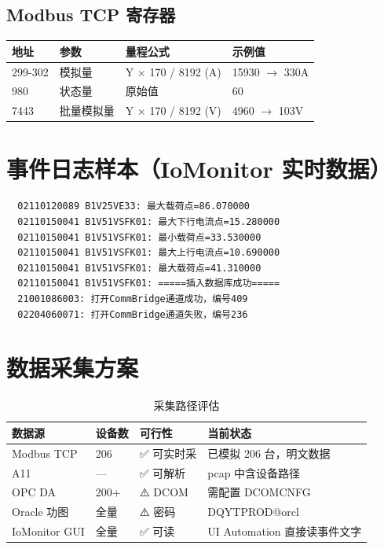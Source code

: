 \documentclass[12pt,a4paper]{ctexart}
\begin{document}
\subsection{Modbus TCP 寄存器}

\begin{table}[H]\centering
\begin{tabular}{p{2cm}p{3cm}p{4cm}p{4cm}}
\toprule
\textbf{地址} & \textbf{参数} & \textbf{量程公式} & \textbf{示例值} \\
\midrule
299-302 & 模拟量 & Y $\times$ 170 / 8192 (A) & 15930 $\rightarrow$ 330A \\
980 & 状态量 & 原始值 & 60 \\
7443 & 批量模拟量 & Y $\times$ 170 / 8192 (V) & 4960 $\rightarrow$ 103V \\
\bottomrule
\end{tabular}
\end{table}

\section{事件日志样本（IoMonitor 实时数据）}

\begin{verbatim}
  02110120089 B1V25VE33: 最大载荷点=86.070000
  02110150041 B1V51VSFK01: 最大下行电流点=15.280000
  02110150041 B1V51VSFK01: 最小载荷点=33.530000
  02110150041 B1V51VSFK01: 最大上行电流点=10.690000
  02110150041 B1V51VSFK01: 最大载荷点=41.310000
  02110150041 B1V51VSFK01: =====插入数据库成功=====
  21001086003: 打开CommBridge通道成功，编号409
  02204060071: 打开CommBridge通道失败，编号236
\end{verbatim}

\section{数据采集方案}

\begin{table}[H]\centering
\caption{采集路径评估}
\begin{tabular}{p{2.5cm}p{2cm}p{2.5cm}p{5cm}}
\toprule
\textbf{数据源} & \textbf{设备数} & \textbf{可行性} & \textbf{当前状态} \\
\midrule
Modbus TCP & 206 & ✅ 可实时采 & 已模拟 206 台，明文数据 \\
A11 & --- & ✅ 可解析 & pcap 中含设备路径 \\
OPC DA & 200+ & ⚠️ DCOM & 需配置 DCOMCNFG \\
Oracle 功图 & 全量 & ⚠️ 密码 & DQYTPROD@orcl \\
IoMonitor GUI & 全量 & ✅ 可读 & UI Automation 直接读事件文字 \\
\bottomrule
\end{tabular}
\end{table}
\end{document}
